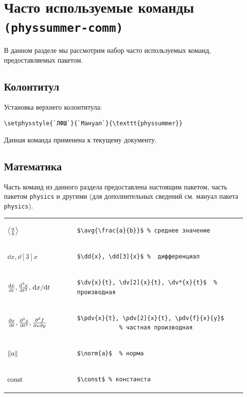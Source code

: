\section{Часто используемые команды \texttt{(physsummer-comm)}}

В данном разделе мы рассмотрим набор часто используемых команд, предоставляемых пакетом.

\subsection{Колонтитул}

Установка верхнего колонтитула:
\begin{lstlisting}[gobble = 3]
	\setphysstyle{`ЛФШ`}{`Мануал`}{\texttt{physsummer}}
\end{lstlisting}

Данная команда применена к текущему документу.

\subsection{Математика}

Часть команд из данного раздела предоставлена настоящим пакетом, часть пакетом \texttt{physics} и другими
(для дополнительных сведений см. мануал пакета \texttt{physics}).

\smallskip

\noindent
\begin{tabular}{C{0.28\linewidth} C{0.685\linewidth}}
    $\left\langle {\frac{a}{b}} \right\rangle$ &
        \begin{lstlisting}[gobble = 11]
            $\avg{\frac{a}{b}}$ % среднее значение
        \end{lstlisting} \\
    $\dd{x}, \dd[3]{x}$ &
        \begin{lstlisting}[gobble = 11]
            $\dd{x}, \dd[3]{x}$ %  дифференциал
        \end{lstlisting} \\
    $\dv{x}{t}, \dv[2]{x}{t}, \dv*{x}{t}$ &
        \begin{lstlisting}[gobble = 11]
            $\dv{x}{t}, \dv[2]{x}{t}, \dv*{x}{t}$  % производная
        \end{lstlisting} \\
    $\pdv{x}{t}, \pdv[2]{x}{t}, \pdv{f}{x}{y}$ &
        \begin{lstlisting}[gobble = 11]
            $\pdv{x}{t}, \pdv[2]{x}{t}, \pdv{f}{x}{y}$
            % частная производная
        \end{lstlisting} \\
    $\norm{a}$ &
        \begin{lstlisting}[gobble = 11]
            $\norm{a}$  % норма
        \end{lstlisting} \\
    $\mathrm{const}$ &
        \begin{lstlisting}[gobble = 11]
            $\const$ % констанста
        \end{lstlisting} \\
\end{tabular}



